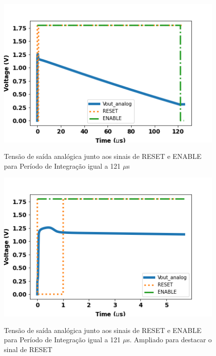 \begin{figure}[!h]
 \centering
    \centering
    \caption{Tensão de saída analógica junto aos sinais de RESET e ENABLE para Período de Integração igual a 121 $\mu$s}
    \includegraphics[scale=0.6]{Resultados/Graficos/reseteenable-tb_pixel125.png}
    \label{graf125}
\end{figure}

\begin{figure}[!h]
 \centering
    \centering
    \caption{Tensão de saída analógica junto aos sinais de RESET e ENABLE para Período de Integração igual a 121 $\mu$s. Ampliado para destacar o sinal de RESET}
    \includegraphics[scale=0.6]{Resultados/Graficos/reseteenable-tb_pixel125_zoom.png}
    \label{graf125z}
\end{figure}


